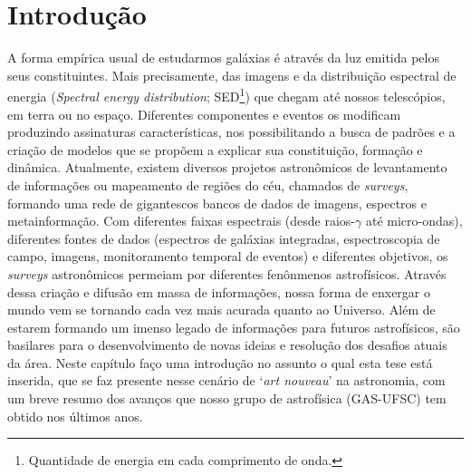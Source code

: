 


\chapter{Introdução}
\label{sec:intro}


A forma empírica usual de estudarmos galáxias é através da luz emitida pelos seus constituintes. Mais precisamente, das imagens e da distribuição espectral de energia ({\em Spectral energy distribution}; SED\footnote{Quantidade de energia em cada comprimento de onda.}) que chegam até nossos telescópios, em terra ou no espaço. Diferentes componentes e eventos os modificam produzindo assinaturas características, nos possibilitando a busca de padrões e a criação de modelos que se propõem a explicar sua constituição, formação e dinâmica. Atualmente, existem diversos projetos astronômicos de levantamento de informações ou mapeamento de regiões do céu, chamados de {\em surveys}, formando uma rede de gigantescos bancos de dados de imagens, espectros e metainformação. Com diferentes faixas espectrais (desde raios-$\gamma$ até micro-ondas), diferentes fontes de dados (espectros de galáxias integradas, espectroscopia de campo, imagens, monitoramento temporal de eventos) e diferentes objetivos, os {\em surveys} astronômicos permeiam por diferentes fenônmenos astrofísicos. Através dessa criação e difusão em massa de informações, nossa forma de enxergar o mundo vem se tornando cada vez mais acurada quanto ao Universo. Além de estarem formando um imenso legado de informações para futuros astrofísicos, são basilares para o desenvolvimento de novas ideias e resolução dos desafios atuais da área. Neste capítulo faço uma introdução no assunto o qual esta tese está inserida, que se faz presente nesse cenário de `{\em art nouveau}' na astronomia, com um breve resumo dos avanços que nosso grupo de astrofísica (GAS-UFSC) tem obtido nos últimos anos.


